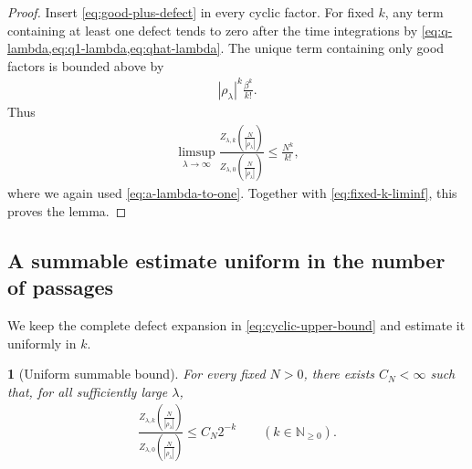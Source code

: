 \documentclass[a4paper,10pt]{article}
\numberwithin{equation}{section}
\theoremstyle{plain}
\theoremstyle{plain}
\newtheorem{lem}[thm]{\protect\lemmaname}
\theoremstyle{plain}
\theoremstyle{plain}
\theoremstyle{plain}
\theoremstyle{remark}
\theoremstyle{definition}
\providecommand{\lemmaname}{Lemma}
\newcommand{\NN}{\mathbb{N}}
\newcommand{\abs}[1]{\left\lvert#1\right\rvert}
\newcommand{\eq}[1]{\begin{align*}#1\end{align*}}
\newcommand{\br}[1]{\left(#1\right)}
\begin{document}
\begin{proof}
Insert \cref{eq:good-plus-defect} in every cyclic factor. For fixed $k$, any term containing at least one defect tends to zero after the time integrations by \cref{eq:q-lambda,eq:q1-lambda,eq:qhat-lambda}. The unique term containing only good factors is bounded above by
\eq{
\abs{\rho_\lambda}^k\frac{\beta^k}{k!}.
}
Thus
\eq{
\limsup_{\lambda\to\infty}
\frac{Z_{\lambda,k}\br{\frac{N}{\abs{\rho_\lambda}}}}{Z_{\lambda,0}\br{\frac{N}{\abs{\rho_\lambda}}}}
\leq
\frac{N^k}{k!},
}
where we again used \cref{eq:a-lambda-to-one}. Together with \cref{eq:fixed-k-liminf}, this proves the lemma.
\end{proof}

\subsection{A summable estimate uniform in the number of passages}

We keep the complete defect expansion in \cref{eq:cyclic-upper-bound} and estimate it uniformly in $k$.

\begin{lem}[Uniform summable bound]
\label{lem:uniform-summable-passage-bound}
For every fixed $N>0$, there exists $C_N<\infty$ such that, for all sufficiently large $\lambda$,
\eq{
\frac{Z_{\lambda,k}\br{\frac{N}{\abs{\rho_\lambda}}}}{Z_{\lambda,0}\br{\frac{N}{\abs{\rho_\lambda}}}}
\leq
C_N2^{-k}
\qquad
(k\in\NN_{\geq0}).
}
\end{lem}
\end{document}
